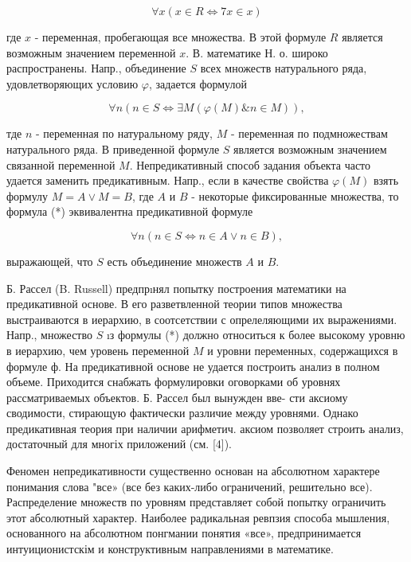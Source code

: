 \documentclass[10pt]{article}
\begin{document}
\[

\forall x(x \in R \Longleftrightarrow 7 x \in x)

\]



где $x$ - переменная, пробегающая все множества. В этой формуле $R$ является возможным значением переменной $x$. В. математике Н. о. широко распространены. Напр., объединение $S$ всех множеств натурального ряда, удовлетворяющих условию $\varphi$, задается формулой



\[

\forall n(n \in S \Longleftrightarrow \exists M(\varphi(M) \& n \in M)),

\]



тде $n$ - переменная по натуральному ряду, $M$ - переменная по подмножествам натурального ряда. В приведенной формуле $S$ является возможным значением связанной переменной $M$. Непредикативный способ задания объекта часто удается заменить предикативным. Напр., если в качестве свойства $\varphi(M)$ взять формулу $M=A \vee M=B$, где $A$ и $B$ - некоторые фиксированные множества, то формула (*) эквивалентна предикативной формуле



\[

\forall n(n \in S \Longleftrightarrow n \in A \vee n \in B),

\]



выражающей, что $S$ есть объединение множеств $A$ и $B$.



Б. Рассел (B. Russell) предпрıнял попытку построения математики на предикативной основе. В его разветвленной теории типов множества выстраиваются в иерархию, в соотсетствии с опрелеляющими их выражениями. Напр., множество $S$ ıз формулы (*) должно относиться к более высокому уровню в иерархию, чем уровень переменной $M$ и уровни переменных, содержащихся в формуле ф. На предикативной основе не удается построить анализ в полном объеме. Приходится снабжать формулировки оговорками об уровнях рассматриваемых объектов. Б. Рассел был вынужден вве- сти аксиому сводимости, стирающую фактически различие между уровнями. Однако предикативная теория при наличии арифметич. аксиом позволяет строить анализ, достаточный для многіх приложений (см. [4]).



Феномен непредикативности существенно основан на абсолютном характере понимания слова "все» (все без каких-либо ограничений, решительно все). Распределение множеств по уровням представляет собой попытку ограничить этот абсолютный характер. Наиболее радикальная ревпзия способа мышления, основанного на абсолютном понгмании понятия «все», предпринимается интуиционистскім и конструктивным направлениями в математике.
\end{document}
